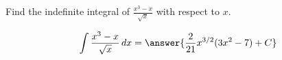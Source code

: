 \documentclass{ximera}
\author{Gregory Hartman \and Matthew Carr}
\begin{document}
\begin{exercise}

Find the indefinite integral of $\frac{x^3-x}{\sqrt{x}}$ with respect to $x$.

\[
\int \frac{x^3-x}{\sqrt{x}}\d x=\answer{\frac{2}{21}x^{3/2}(3x^2-7)+C}
\]

\end{exercise}
\end{document}
